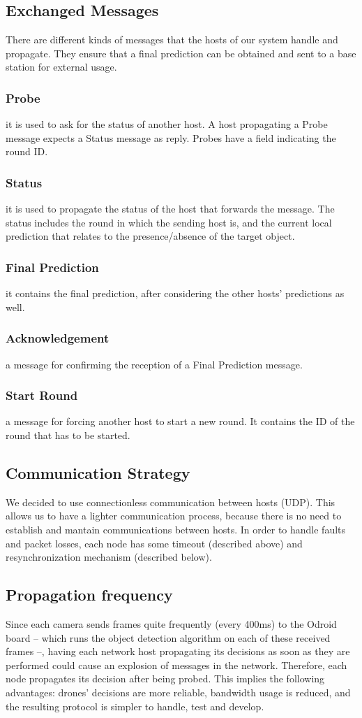 \documentclass[10pt,conference,compsocconf]{IEEEtran}
\begin{document}
\subsection{Exchanged Messages}
There are different kinds of messages that the hosts of our system handle and propagate. They ensure that a final prediction can be obtained and sent to a base station for external usage.
\subsubsection{Probe} it is used to ask for the status of another host. A host propagating a Probe message expects a Status message as reply. Probes have a field indicating the round ID.
\subsubsection{Status} it is used to propagate the status of the host that forwards the message. The status includes the round in which the sending host is, and the current local prediction that relates to the presence/absence of the target object.
\subsubsection{Final Prediction} it contains the final prediction, after considering the other hosts' predictions as well.
\subsubsection{Acknowledgement} a message for confirming the reception of a Final Prediction message.
\subsubsection{Start Round} a message for forcing another host to start a new round. It contains the ID of the round that has to be started.
\subsection{Communication Strategy}We decided to use connectionless communication between hosts (UDP). This allows us to have a lighter communication process, because there is no need to establish and mantain communications between hosts. In order to handle faults and packet losses, each node has some timeout (described above) and resynchronization mechanism (described below).
\subsection{Propagation frequency}Since each camera sends frames quite frequently (every 400ms) to the Odroid board -- which runs the object detection algorithm on each of these received frames --, having each network host propagating its decisions as soon as they are performed could cause an explosion of messages in the network. Therefore, each node propagates its decision after being probed. This implies the following advantages: drones' decisions are more reliable, bandwidth usage is reduced, and the resulting protocol is simpler to handle, test and develop.
\end{document}
